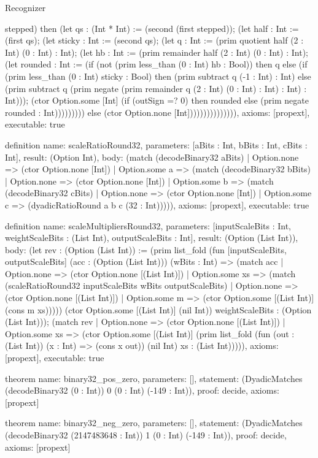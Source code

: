 \begin{lexlean}{Recognizer}
\begin{semanticmodule}
{stepped) then (let qs : (Int * Int) := (second (first stepped)); (let half : Int := (first qs); (let sticky : Int := (second qs); (let q : Int := (prim quotient half (2 : Int) (0 : Int) : Int); (let hb : Int := (prim remainder half (2 : Int) (0 : Int) : Int); (let rounded : Int := (if (not (prim less_than (0 : Int) hb : Bool)) then q else (if (prim less_than (0 : Int) sticky : Bool) then (prim subtract q (-1 : Int) : Int) else (prim subtract q (prim negate (prim remainder q (2 : Int) (0 : Int) : Int) : Int) : Int))); (ctor Option.some [Int] (if (outSign =? 0) then rounded else (prim negate rounded : Int))))))))) else (ctor Option.none [Int])))))))))))))),
  axioms: [propext],
  executable: true
}

definition{
  name: scaleRatioRound32,
  parameters: [aBits : Int, bBits : Int, cBits : Int],
  result: (Option Int),
  body: (match (decodeBinary32 aBits)
    | Option.none => (ctor Option.none [Int])
    | Option.some a => (match (decodeBinary32 bBits)
      | Option.none => (ctor Option.none [Int])
      | Option.some b => (match (decodeBinary32 cBits)
        | Option.none => (ctor Option.none [Int])
        | Option.some c => (dyadicRatioRound a b c (32 : Int))))),
  axioms: [propext],
  executable: true
}

definition{
  name: scaleMultipliersRound32,
  parameters: [inputScaleBits : Int, weightScaleBits : (List Int), outputScaleBits : Int],
  result: (Option (List Int)),
  body: (let rev : (Option (List Int)) := (prim list_fold (fun [inputScaleBits, outputScaleBits] (acc : (Option (List Int))) (wBits : Int) => (match acc
    | Option.none => (ctor Option.none [(List Int)])
    | Option.some xs => (match (scaleRatioRound32 inputScaleBits wBits outputScaleBits)
      | Option.none => (ctor Option.none [(List Int)])
      | Option.some m => (ctor Option.some [(List Int)] (cons m xs))))) (ctor Option.some [(List Int)] (nil Int)) weightScaleBits : (Option (List Int))); (match rev
    | Option.none => (ctor Option.none [(List Int)])
    | Option.some xs => (ctor Option.some [(List Int)] (prim list_fold (fun (out : (List Int)) (x : Int) => (cons x out)) (nil Int) xs : (List Int))))),
  axioms: [propext],
  executable: true
}

theorem{
  name: binary32_pos_zero,
  parameters: [],
  statement: (DyadicMatches (decodeBinary32 (0 : Int)) 0 (0 : Int) (-149 : Int)),
  proof: decide{},
  axioms: [propext]
}

theorem{
  name: binary32_neg_zero,
  parameters: [],
  statement: (DyadicMatches (decodeBinary32 (2147483648 : Int)) 1 (0 : Int) (-149 : Int)),
  proof: decide{},
  axioms: [propext]
}


\end{semanticmodule}
\end{lexlean}
